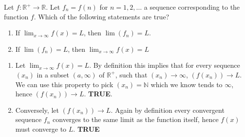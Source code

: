 \documentclass[boxes, qed]{homework}
\begin{document}
\begin{problem}Let $f:\mathbb{R}^+ \rightarrow \mathbb{R}$. Let $f_n=f(n)$ for $n = 1, 2, \dots$ 
  a sequence corresponding to the function $f$. Which of the following statements are true?
  \begin{enumerate}
    \item If $\lim_{x \to \infty} f(x)=L$, then $\lim(f_n)=L$.
    \item If $\lim(f_n)=L$, then $\lim_{x \to \infty} f(x)=L$
  \end{enumerate}
\end{problem}
\begin{solution}
  \begin{enumerate}
    \item Let $\lim_{x\to \infty}f(x)=L$. By definition this implies
    that for every sequence $(x_n)$ in a subset $(a,\infty)$ of $\mathbb{R}^+$,
    such that $(x_n)\to \infty$, $(f(x_n))\to L$. We can use this property to pick
    $(x_n)=\mathbb{N}$ which we know tends to $\infty$, hence $(f(x_n))\to L$.
    \textbf{TRUE}.
    
    \item Conversely, let $(f(x_n))\to L$. Again by definition every convergent
    sequence $f_n$ converges to the same limit as the function itself, hence
    $f(x)$ must converge to $L$. \textbf{TRUE}
  \end{enumerate}
\end{solution}
\end{document}
